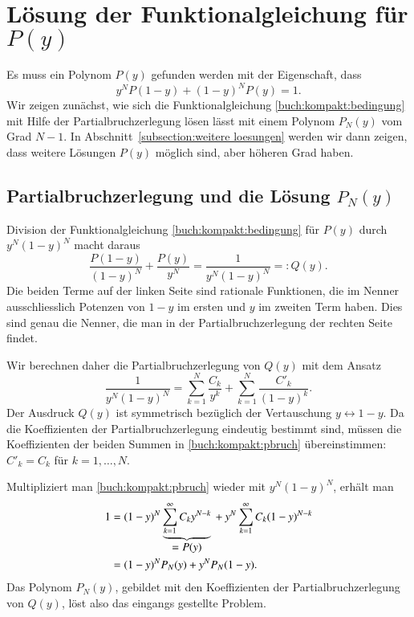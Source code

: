 %
%
%

\section{Lösung der Funktionalgleichung für $P(y)$
\label{section:partialbruch}}
Es muss ein Polynom $P(y)$ gefunden werden mit der Eigenschaft, dass
\begin{equation}
y^N P(1-y) + (1-y)^N P(y) = 1.
\label{buch:kompakt:bedingung}
\end{equation}
Wir zeigen zunächst, wie sich die Funktionalgleichung
\eqref{buch:kompakt:bedingung} mit Hilfe der Partialbruchzerlegung lösen
lässt mit einem Polynom $P_N(y)$ vom Grad $N-1$.
In Abschnitt~\ref{subsection:weitere loesungen} werden wir dann
zeigen, dass weitere Lösungen $P(y)$ möglich sind, aber höheren Grad haben.


\subsection{Partialbruchzerlegung und die Lösung $P_N(y)$}
%
Division der Funktionalgleichung \eqref{buch:kompakt:bedingung} für $P(y)$
durch $y^N(1-y)^N$ macht daraus
\[
\frac{P(1-y)}{(1-y)^N}
+
\frac{P(y)}{y^N}
=
\frac{1}{y^N(1-y)^N}
=:
Q(y).
\]
Die beiden Terme auf der linken Seite sind rationale Funktionen, die im
Nenner ausschliesslich Potenzen von $1-y$ im ersten und $y$ im zweiten
Term haben.
Dies sind genau die Nenner, die man in der Partialbruchzerlegung der rechten
Seite findet.

Wir berechnen daher die Partialbruchzerlegung von $Q(y)$ mit dem Ansatz
\begin{equation}
\frac{1}{y^N(1-y)^N}
=
\sum_{k=1}^N\frac{C_k}{y^k}
+
\sum_{k=1}^N\frac{C'_k}{(1-y)^k}.
\label{buch:kompakt:pbruch}
\end{equation}
Der Ausdruck $Q(y)$ ist symmetrisch bezüglich der Vertauschung
$y\leftrightarrow 1-y$.
Da die Koeffizienten der Partialbruchzerlegung eindeutig bestimmt sind,
müssen die Koeffizienten der beiden Summen in \eqref{buch:kompakt:pbruch}
übereinstimmen: $C'_k=C_k$ für $k=1,\dots,N$.

Multipliziert man \eqref{buch:kompakt:pbruch} wieder mit $y^N(1-y)^N$,
erhält man
\begin{align*}
1
&=
(1-y)^N
\underbrace{\sum_{k=1}^\infty C_k y^{N-k}}_{\displaystyle =P(y)}
\mathstrut
+
y^N
\sum_{k=1}^\infty C_k (1-y)^{N-k}
\\
&=
(1-y)^N
P_N(y)
+
y^N
P_N(1-y).
\end{align*}
Das Polynom $P_N(y)$, gebildet mit den Koeffizienten der Partialbruchzerlegung
von $Q(y)$, löst also das eingangs gestellte Problem.

